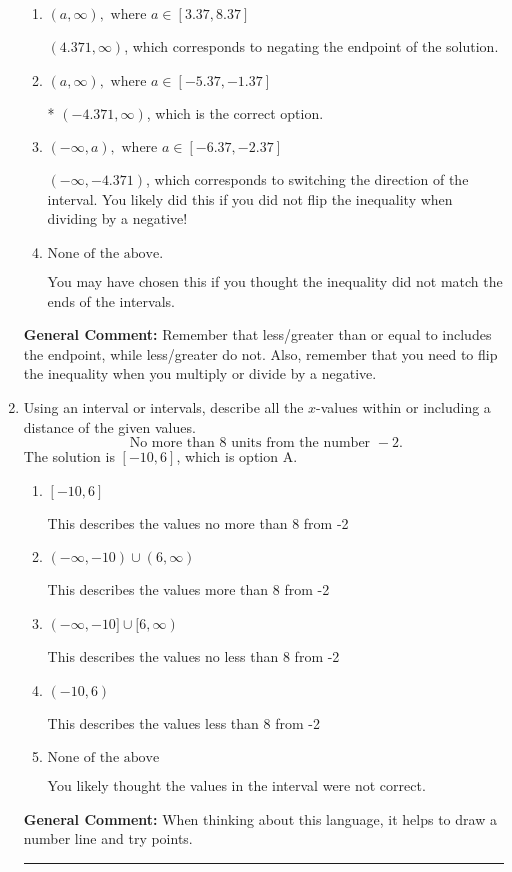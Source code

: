 \documentclass{extbook}[14pt]
\newcommand{\litem}[1]{\item #1

\rule{\textwidth}{0.4pt}}
\begin{document}
\begin{enumerate}
{\begin{enumerate}[label=\Alph*.]
 $(-\infty, 4.371)$, which corresponds to switching the direction of the interval AND negating the endpoint. You likely did this if you did not flip the inequality when dividing by a negative as well as not moving values over to a side properly.
\item \( (a, \infty), \text{ where } a \in [3.37, 8.37] \)

 $(4.371, \infty)$, which corresponds to negating the endpoint of the solution.
\item \( (a, \infty), \text{ where } a \in [-5.37, -1.37] \)

* $(-4.371, \infty)$, which is the correct option.
\item \( (-\infty, a), \text{ where } a \in [-6.37, -2.37] \)

 $(-\infty, -4.371)$, which corresponds to switching the direction of the interval. You likely did this if you did not flip the inequality when dividing by a negative!
\item \( \text{None of the above}. \)

You may have chosen this if you thought the inequality did not match the ends of the intervals.
\end{enumerate}

\textbf{General Comment:} Remember that less/greater than or equal to includes the endpoint, while less/greater do not. Also, remember that you need to flip the inequality when you multiply or divide by a negative.
}
\litem{
Using an interval or intervals, describe all the $x$-values within or including a distance of the given values.
\[ \text{ No more than } 8 \text{ units from the number } -2. \]The solution is \( [-10, 6] \), which is option A.\begin{enumerate}[label=\Alph*.]
\item \( [-10, 6] \)

This describes the values no more than 8 from -2
\item \( (-\infty, -10) \cup (6, \infty) \)

This describes the values more than 8 from -2
\item \( (-\infty, -10] \cup [6, \infty) \)

This describes the values no less than 8 from -2
\item \( (-10, 6) \)

This describes the values less than 8 from -2
\item \( \text{None of the above} \)

You likely thought the values in the interval were not correct.
\end{enumerate}

\textbf{General Comment:} When thinking about this language, it helps to draw a number line and try points.
}
\end{enumerate}
\end{document}
